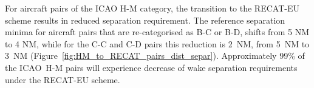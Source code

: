 For aircraft pairs of the ICAO H-M category, the transition to the RECAT-EU scheme results in reduced separation requirement. The reference separation minima for aircraft pairs that are re-categorised as B-C or B-D, shifts from 5 NM to 4 NM, while for the C-C and C-D pairs this reduction is 2~NM, from 5~NM to 3~NM (Figure~\ref{fig:HM_to_RECAT_pairs_dist_separ}). Approximately 99\% of the ICAO~H-M pairs will experience decrease of wake separation requirements under the RECAT-EU scheme.

\begin{figure}[h]
    \centering
    
    \vspace{1cm}
    
    

\end{figure}
